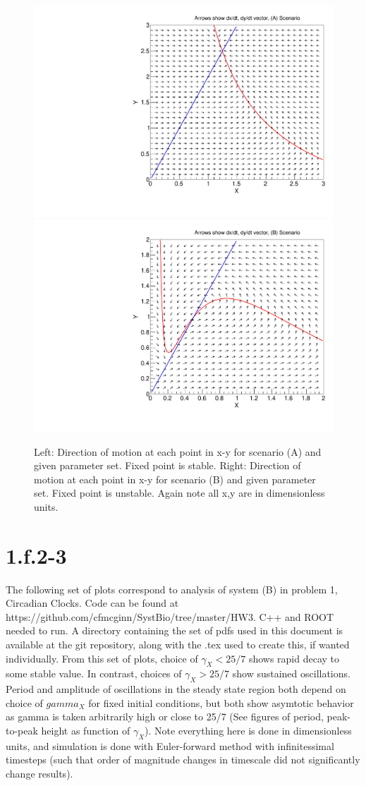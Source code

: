 \documentclass{article}
\begin{document}
\begin{figure}[H]
    \centering
    \includegraphics[width=.49\textwidth]{canv1.pdf} 
    \includegraphics[width=.49\textwidth]{canv2.pdf}
    \caption{Left: Direction of motion at each point in x-y for scenario (A) and given parameter set. Fixed point is stable. Right: Direction of motion at each point in x-y for scenario (B) and given parameter set. Fixed point is unstable. Again note all x,y are in dimensionless units.}
    \label{}
\end{figure}

\section{1.f.2-3}
The following set of plots correspond to analysis of system (B) in problem 1, Circadian Clocks. Code can be found at https://github.com/cfmcginn/SystBio/tree/master/HW3. C++ and ROOT needed to run. A directory containing the set of pdfs used in this document is available at the git repository, along with the .tex used to create this, if wanted individually. From this set of plots, choice of $\gamma_{X} < 25/7$ shows rapid decay to some stable value. In contrast, choices of $\gamma_{X} > 25/7$ show sustained oscillations. Period and amplitude of oscillations in the steady state region both depend on choice of $gamma_{X}$ for fixed initial conditions, but both show asymtotic behavior as gamma is taken arbitrarily high or close to 25/7 (See figures of period, peak-to-peak height as function of $\gamma_{X}$). Note everything here is done in dimensionless units, and simulation is done with Euler-forward method with infinitessimal timesteps (such that order of magnitude changes in timescale did not significantly change results). 
\end{document}
